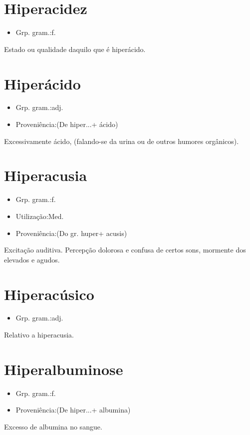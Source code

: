 \documentclass{article}
\begin{document}
\section{Hiperacidez}
\begin{itemize}
\item {Grp. gram.:f.}
\end{itemize}
Estado ou qualidade daquilo que é hiperácido.
\section{Hiperácido}
\begin{itemize}
\item {Grp. gram.:adj.}
\end{itemize}
\begin{itemize}
\item {Proveniência:(De \textunderscore hiper...\textunderscore  + \textunderscore ácido\textunderscore )}
\end{itemize}
Excessivamente ácido, (falando-se da urina ou de outros humores orgânicos).
\section{Hiperacusia}
\begin{itemize}
\item {Grp. gram.:f.}
\end{itemize}
\begin{itemize}
\item {Utilização:Med.}
\end{itemize}
\begin{itemize}
\item {Proveniência:(Do gr. \textunderscore huper\textunderscore  + \textunderscore acusis\textunderscore )}
\end{itemize}
Excitação auditiva.
Percepção dolorosa e confusa de certos sons, mormente dos elevados e agudos.
\section{Hiperacúsico}
\begin{itemize}
\item {Grp. gram.:adj.}
\end{itemize}
Relativo a hiperacusia.
\section{Hiperalbuminose}
\begin{itemize}
\item {Grp. gram.:f.}
\end{itemize}
\begin{itemize}
\item {Proveniência:(De \textunderscore hiper...\textunderscore  + \textunderscore albumina\textunderscore )}
\end{itemize}
Excesso de albumina no sangue.
\end{document}
